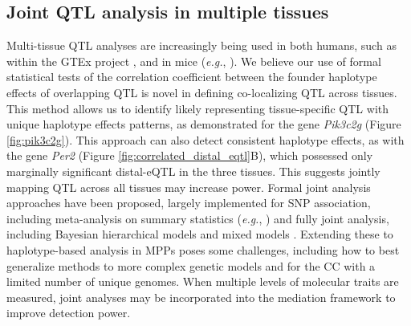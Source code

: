 \documentclass[9pt,twocolumn,twoside]{gsajnl}
\newcommand{\eg}{\emph{e.g.}\xspace}
\begin{document}

\subsection{Joint QTL analysis in multiple tissues}

Multi-tissue QTL analyses are increasingly being used in both humans, such as within the GTEx project \citep{GTEX2017}, 
and in mice (\eg, \citealt{Huang2009}).
We believe our use of formal statistical tests of the correlation coefficient between the founder haplotype effects of overlapping QTL is novel in defining co-localizing QTL across tissues. This method allows us to identify likely representing tissue-specific QTL with unique haplotype effects patterns, as demonstrated for the gene \textit{Pik3c2g} (Figure \ref{fig:pik3c2g}).
%
This approach can also detect consistent haplotype effects, as with the gene \textit{Per2} (Figure \ref{fig:correlated_distal_eqtl}B), which possessed only marginally significant distal-eQTL in the three tissues. This suggests jointly mapping QTL across all tissues may increase power. Formal joint analysis approaches have been proposed, largely implemented for SNP association, including meta-analysis on summary statistics (\eg, \citealt{Fu2012a, Sul2013}) and fully joint analysis, including Bayesian hierarchical models \citep{Flutre2013} and mixed models \citep{Acharya2016}. Extending these to haplotype-based analysis in MPPs poses some challenges, including how to best generalize methods to more complex genetic models and for the CC with a limited number of unique genomes. 
When multiple levels of molecular traits are measured, joint analyses may be incorporated into the mediation framework to improve detection power.
\end{document}
